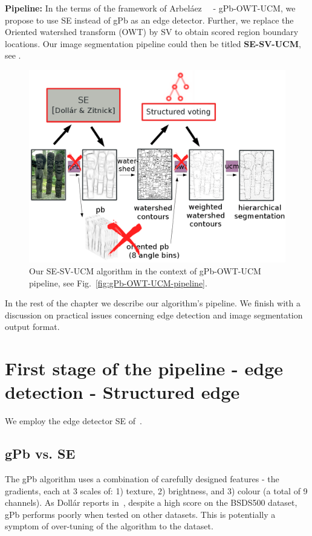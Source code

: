 \textbf{Pipeline:} In the terms of the framework of Arbel\'aez~\etal~\cite{Arbelaez11} - gPb-OWT-UCM, we propose to use SE instead of gPb as an edge detector. Further, we replace the Oriented watershed transform (OWT) by SV to obtain scored region boundary locations. Our image segmentation pipeline could then be titled \textbf{SE-SV-UCM}, see .

\begin{figure}[ht!]
\centering
 \includegraphics[width=1\textwidth]{images/SE-SV-UCM/SE-SV-UCM_pipeline.png}
\caption{Our SE-SV-UCM algorithm in the context of gPb-OWT-UCM pipeline, see Fig.~\protect\ref{fig:gPb-OWT-UCM-pipeline}.}
\label{fig:SE-SV-UCM-pipeline}
\end{figure}

In the rest of the chapter we describe our algorithm's pipeline. We finish with a discussion on practical issues concerning edge detection and image segmentation output format.

\section[First stage of the pipeline - Structured edge]{First stage of the pipeline - edge detection - Structured edge}
We employ the edge detector SE of~\cite{DollarICCV13edges,Dollar2015PAMI}.

\subsection{gPb vs. SE}
The gPb algorithm uses a combination of carefully designed features - the gradients, each at 3 scales of: 1) texture, 2) brightness, and 3) colour (a total of 9 channels). As Doll\'ar reports in~\cite{DollarICCV13edges}, despite a high score on the BSDS500 dataset, gPb performs poorly when tested on other datasets. This is potentially a symptom of over-tuning of the algorithm to the dataset.


